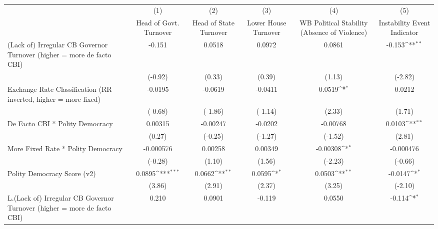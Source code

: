 {
\def\sym#1{\ifmmode^{#1}\else\(^{#1}\)\fi}
\begin{longtable}{l*{5}{c}}
\toprule\endfirsthead\midrule\endhead\midrule\endfoot\endlastfoot
                &\multicolumn{1}{c}{(1)}&\multicolumn{1}{c}{(2)}&\multicolumn{1}{c}{(3)}&\multicolumn{1}{c}{(4)}&\multicolumn{1}{c}{(5)}\\
                &\multicolumn{1}{c}{Head of Govt. Turnover}&\multicolumn{1}{c}{Head of State Turnover}&\multicolumn{1}{c}{Lower House Turnover}&\multicolumn{1}{c}{WB Political Stability (Absence of Violence)}&\multicolumn{1}{c}{Instability Event Indicator}\\
\midrule
(Lack of) Irregular CB Governor Turnover (higher = more de facto CBI)&   -0.151         &   0.0518         &   0.0972         &   0.0861         &   -0.153\sym{**} \\
                &  (-0.92)         &   (0.33)         &   (0.39)         &   (1.13)         &  (-2.82)         \\
\addlinespace
Exchange Rate Classification (RR inverted, higher = more fixed)&  -0.0195         &  -0.0619         &  -0.0411         &   0.0519\sym{*}  &   0.0212         \\
                &  (-0.68)         &  (-1.86)         &  (-1.14)         &   (2.33)         &   (1.71)         \\
\addlinespace
De Facto CBI * Polity Democracy&  0.00315         & -0.00247         &  -0.0202         & -0.00768         &   0.0103\sym{**} \\
                &   (0.27)         &  (-0.25)         &  (-1.27)         &  (-1.52)         &   (2.81)         \\
\addlinespace
More Fixed Rate * Polity Democracy&-0.000576         &  0.00258         &  0.00349         & -0.00308\sym{*}  &-0.000476         \\
                &  (-0.28)         &   (1.10)         &   (1.56)         &  (-2.23)         &  (-0.66)         \\
\addlinespace
Polity Democracy Score (v2)&   0.0895\sym{***}&   0.0662\sym{**} &   0.0595\sym{*}  &   0.0503\sym{**} &  -0.0147\sym{*}  \\
                &   (3.86)         &   (2.91)         &   (2.37)         &   (3.25)         &  (-2.10)         \\
\addlinespace
L.(Lack of) Irregular CB Governor Turnover (higher = more de facto CBI)&    0.210         &   0.0901         &   -0.119         &   0.0550         &   -0.114\sym{*}  \\

\end{longtable}}
